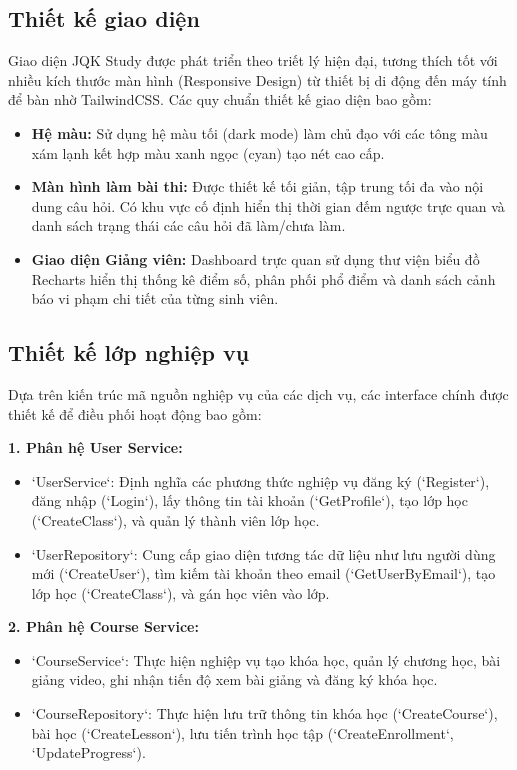 \documentclass[../DoAn.tex]{subfiles}
\begin{document}
\subsection{Thiết kế giao diện}
Giao diện JQK Study được phát triển theo triết lý hiện đại, tương thích tốt với nhiều kích thước màn hình (Responsive Design) từ thiết bị di động đến máy tính để bàn nhờ TailwindCSS. Các quy chuẩn thiết kế giao diện bao gồm:
\begin{itemize}
    \item \textbf{Hệ màu:} Sử dụng hệ màu tối (dark mode) làm chủ đạo với các tông màu xám lạnh kết hợp màu xanh ngọc (cyan) tạo nét cao cấp.
    \item \textbf{Màn hình làm bài thi:} Được thiết kế tối giản, tập trung tối đa vào nội dung câu hỏi. Có khu vực cố định hiển thị thời gian đếm ngược trực quan và danh sách trạng thái các câu hỏi đã làm/chưa làm.
    \item \textbf{Giao diện Giảng viên:} Dashboard trực quan sử dụng thư viện biểu đồ Recharts hiển thị thống kê điểm số, phân phối phổ điểm và danh sách cảnh báo vi phạm chi tiết của từng sinh viên.
\end{itemize}

\subsection{Thiết kế lớp nghiệp vụ}
Dựa trên kiến trúc mã nguồn nghiệp vụ của các dịch vụ, các interface chính được thiết kế để điều phối hoạt động bao gồm:

\textbf{1. Phân hệ User Service:}
\begin{itemize}
    \item `UserService`: Định nghĩa các phương thức nghiệp vụ đăng ký (`Register`), đăng nhập (`Login`), lấy thông tin tài khoản (`GetProfile`), tạo lớp học (`CreateClass`), và quản lý thành viên lớp học.
    \item `UserRepository`: Cung cấp giao diện tương tác dữ liệu như lưu người dùng mới (`CreateUser`), tìm kiếm tài khoản theo email (`GetUserByEmail`), tạo lớp học (`CreateClass`), và gán học viên vào lớp.
\end{itemize}

\textbf{2. Phân hệ Course Service:}
\begin{itemize}
    \item `CourseService`: Thực hiện nghiệp vụ tạo khóa học, quản lý chương học, bài giảng video, ghi nhận tiến độ xem bài giảng và đăng ký khóa học.
    \item `CourseRepository`: Thực hiện lưu trữ thông tin khóa học (`CreateCourse`), bài học (`CreateLesson`), lưu tiến trình học tập (`CreateEnrollment`, `UpdateProgress`).
\end{itemize}
\end{document}

